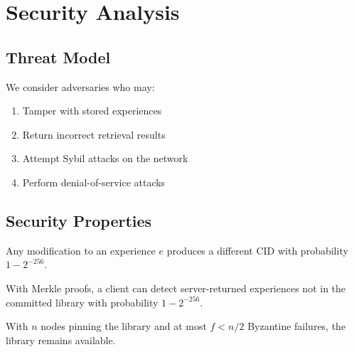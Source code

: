 \section{Security Analysis}


\subsection{Threat Model}

We consider adversaries who may:
\begin{enumerate}
    \item Tamper with stored experiences
    \item Return incorrect retrieval results
    \item Attempt Sybil attacks on the network
    \item Perform denial-of-service attacks
\end{enumerate}

\subsection{Security Properties}

\begin{theorem}
Any modification to an experience $e$ produces a different CID with probability $1 - 2^{-256}$.
\end{theorem}

\begin{theorem}
With Merkle proofs, a client can detect server-returned experiences not in the committed library with probability $1 - 2^{-256}$.
\end{theorem}

\begin{theorem}[Availability]
With $n$ nodes pinning the library and at most $f < n/2$ Byzantine failures, the library remains available.
\end{theorem}

